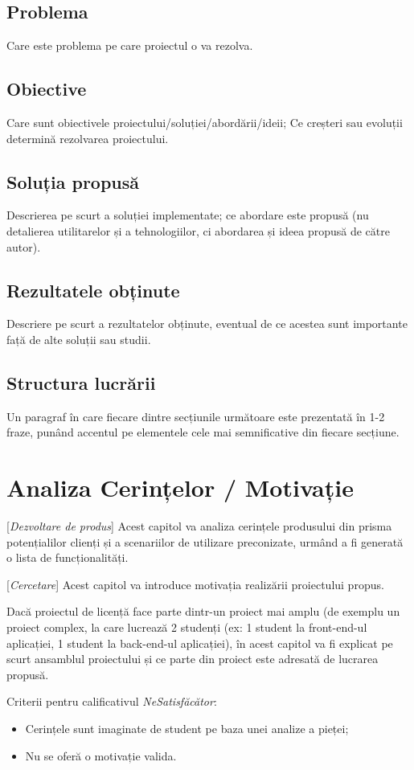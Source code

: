 \documentclass[12pt,a4paper]{report}
\newcommand{\worktype}[1]{[\textit{#1}] }
\newcommand{\dezvoltare}{\worktype{Dezvoltare de produs}}
\newcommand{\cercetare}{\worktype{Cercetare}}
\begin{document}
\section{Problema}
Care este problema pe care proiectul o va rezolva.
\section{Obiective}
Care sunt obiectivele proiectului/soluției/abordării/ideii; Ce creșteri sau evoluții determină rezolvarea proiectului.
\section{Soluția propusă}
Descrierea pe scurt a soluției implementate; ce abordare este propusă (nu detalierea utilitarelor și a tehnologiilor, ci abordarea și ideea propusă de către autor).
\section{Rezultatele obținute}
Descriere pe scurt a rezultatelor obținute, eventual de ce acestea sunt importante față de alte soluții sau studii.
\section{Structura lucrării}
Un paragraf în care fiecare dintre secțiunile următoare este prezentată în 1-2 fraze, punând accentul pe elementele cele mai semnificative din fiecare secțiune.



\chapter{Analiza Cerințelor / Motivație}
\dezvoltare Acest capitol va analiza cerințele produsului din prisma potențialilor clienți și a scenariilor de utilizare preconizate, urmând a fi generată o lista de funcționalități.

\cercetare Acest capitol va introduce motivația realizării proiectului propus.

Dacă proiectul de licență face parte dintr-un proiect mai amplu (de exemplu un proiect complex, la care lucrează 2 studenți (ex: 1 student la front-end-ul aplicației, 1 student la back-end-ul aplicației), în acest capitol va fi explicat pe scurt ansamblul proiectului și ce parte din proiect este adresată de lucrarea propusă.

Criterii pentru calificativul \textit{Ne\textit{Satisfăcător}}:
\begin{itemize}
	\item \dezvoltare Cerințele sunt imaginate de student pe baza unei analize a pieței;
	\item \cercetare Nu se oferă o motivație valida.
\end{itemize}
\end{document}
